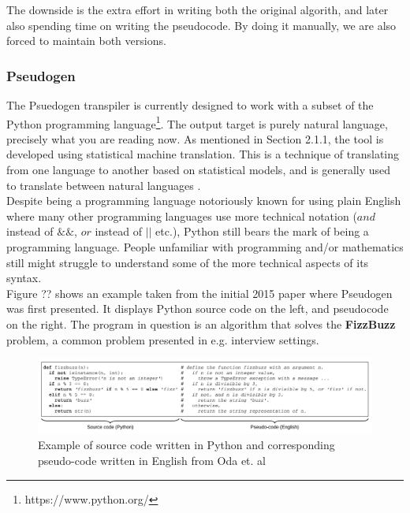 The downside is the extra effort in writing both the original algorith, and later also spending time on writing the pseudocode. By doing it manually, we are also forced to maintain both versions.

\subsubsection{Pseudogen}

The Psuedogen transpiler is currently designed to work with a subset of the Python programming language\footnote{https://www.python.org/}. The output target is purely natural language, precisely what you are reading now. As mentioned in Section 2.1.1, the tool is developed using statistical machine translation. This is a technique of translating from one language to another based on statistical models, and is generally used to translate between natural languages \cite{DBLP:conf/kbse/OdaFNHSTN15}. \hfill \\

Despite being a programming language notoriously known for using plain English where many other programming languages use more technical notation ($and$ instead of $\&\&$, $or$ instead of $||$ etc.), Python still bears the mark of being a programming language. People unfamiliar with programming and/or mathematics still might struggle to understand some of the more technical aspects of its syntax. \hfill \\

Figure ?? shows an example taken from the initial 2015 paper where Pseudogen was first presented. It displays Python source code on the left, and pseudocode on the right. The program in question is an algorithm that solves the \textbf{FizzBuzz} problem, a common problem presented in e.g. interview settings. \hfill \\

\begin{figure}[ht]
    \centering
    \includegraphics[scale=0.52]{assets/odaetal.png}
    \caption{Example of source code written in Python and corresponding pseudo-code written in English from Oda et. al}
    \label{fig:odaetal}
\end{figure}

